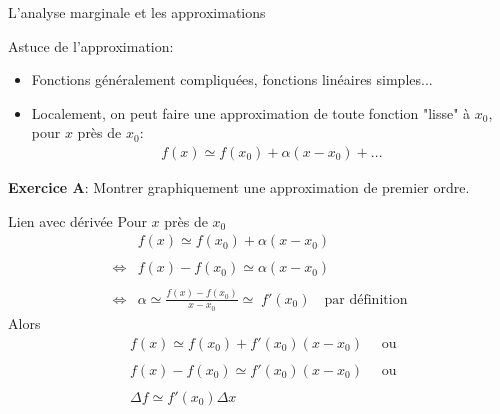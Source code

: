 \documentclass[handout]{beamer}
\begin{document}
\begin{frame}{L'analyse marginale et les approximations}

Astuce de l'approximation:

\begin{itemize}\item Fonctions généralement compliquées, fonctions linéaires simples...
\item Localement, on peut faire une approximation de toute fonction "lisse" à $x_0$, pour $x$ près de $x_0$: 
\begin{eqnarray*} 
	f(x) \simeq f(x_0) + \alpha (x-x_0) + ...  
\end{eqnarray*}
\end{itemize}
\textbf{Exercice A}: Montrer graphiquement une approximation de premier ordre.
\end{frame}

\begin{frame}{Lien avec dérivée}
Pour $x$ près de $x_0$
\begin{align*}
&f(x) \simeq f(x_0) + \alpha (x-x_0) \\ \\ \iff & f(x) -f(x_0) \simeq \alpha (x-x_0)\\\\
 \iff & \alpha \simeq \frac{f(x) -f(x_0)}{x-x_0}  \simeq\; f'(x_0) \quad \text{par définition}
\end{align*}
\pause
Alors  \begin{align*}&f(x) \simeq f(x_0) + f'(x_0) (x-x_0) \quad \text{ ou }\\ \\ &f(x) - f(x_0) \simeq f'(x_0) (x-x_0) \quad \text{ ou } \\ \\
&\Delta f \simeq f'(x_0) \Delta x
\end{align*}

\end{frame}
\end{document}
